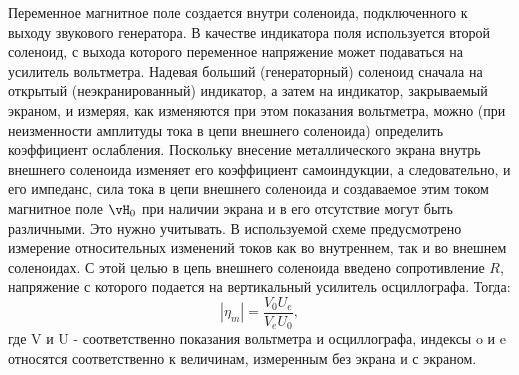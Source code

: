 Переменное магнитное поле создается внутри соленоида, подключенного к выходу звукового генератора. В качестве индикатора поля используется второй соленоид, с выхода которого переменное напряжение может подаваться на усилитель вольтметра. Надевая больший (генераторный) соленоид сначала на открытый (неэкранированный) индикатор, а затем на индикатор, закрываемый экраном, и измеряя, как изменяются при этом показания вольтметра, можно (при неизменности амплитуды тока в цепи внешнего соленоида) определить коэффициент ослабления. Поскольку внесение металлического экрана внутрь внешнего соленоида изменяет его коэффициент самоиндукции, а следовательно, и его импеданс, сила тока в цепи внешнего соленоида и создаваемое этим током магнитное поле $\vH_0$ при наличии экрана и в его отсутствие могут быть различными. Это нужно учитывать. В используемой схеме предусмотрено измерение относительных изменений токов как во внутреннем, так и во внешнем соленоидах. С этой целью в цепь внешнего соленоида введено сопротивление $R$, напряжение с которого подается на вертикальный усилитель осциллографа. Тогда:
\begin{equation}
 	|\eta_m|=\frac{V_0U_e}{V_eU_0},
	\label{eq:7}
\end{equation}
где V и U - соответственно показания вольтметра и осциллографа, индексы o и e относятся соответственно к величинам, измеренным без экрана и с экраном. 





